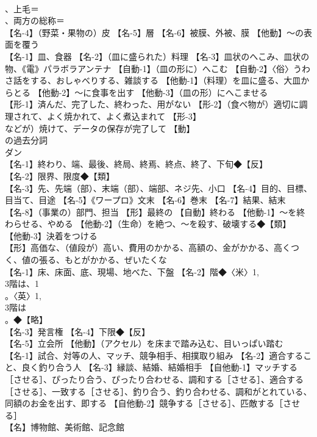 \documentclass[8pt]{extreport}
\begin{document}
\begin{CJK}{UTF8}{min}
\\	、上毛＝
\\	、両方の総称＝
\\	【名-4】（野菜・果物の）皮 【名-5】層 【名-6】被膜、外被、膜 【他動】～の表面を覆う
\\	【名-1】皿、食器 【名-2】（皿に盛られた）料理 【名-3】皿状のへこみ、皿状の物、《電》パラボラアンテナ 【自動-1】（皿の形に）へこむ 【自動-2】〈俗〉うわさ話をする、おしゃべりする、雑談する 【他動-1】（料理）を皿に盛る、大皿からとる 【他動-2】～に食事を出す 【他動-3】（皿の形）にへこませる
\\	【形-1】済んだ、完了した、終わった、用がない 【形-2】（食べ物が）適切に調理されて、よく焼かれて、よく煮込まれて 【形-3】
\\	などが）焼けて、データの保存が完了して 【動】
\\	の過去分詞 
\\	ダン
\\	【名-1】終わり、端、最後、終局、終焉、終点、終了、下旬◆【反】
\\	【名-2】限界、限度◆【類】
\\	【名-3】先、先端（部）、末端（部）、端部、ネジ先、小口 【名-4】目的、目標、目当て、目途 【名-5】《ワープロ》文末 【名-6】巻末 【名-7】結果、結末 【名-8】（事業の）部門、担当 【形】最終の 【自動】終わる 【他動-1】～を終わらせる、やめる 【他動-2】（生命）を絶つ、～を殺す、破壊する◆【類】
\\	【他動-3】決着をつける
\\	【形】高価な、（値段が）高い、費用のかかる、高額の、金がかかる、高くつく、値の張る、もとがかかる、ぜいたくな
\\	【名-1】床、床面、底、現場、地べた、下盤 【名-2】階◆〈米〉1, 
\\	3階は、1
\\	。〈英〉1, 
\\	3階は 
\\	。◆【略】
\\	【名-3】発言権 【名-4】下限◆【反】
\\	【名-5】立会所 【他動】（アクセル）を床まで踏み込む、目いっぱい踏む
\\	【名-1】試合、対等の人、マッチ、競争相手、相撲取り組み 【名-2】適合すること、良く釣り合う人 【名-3】縁談、結婚、結婚相手 【自他動-1】マッチする［させる］、ぴったり合う、ぴったり合わせる、調和する［させる］、適合する［させる］、一致する［させる］、釣り合う、釣り合わせる、調和がとれている、同額のお金を出す、即する 【自他動-2】競争する［させる］、匹敵する［させる］
\\	【名】博物館、美術館、記念館

\end{CJK}
\end{document}
